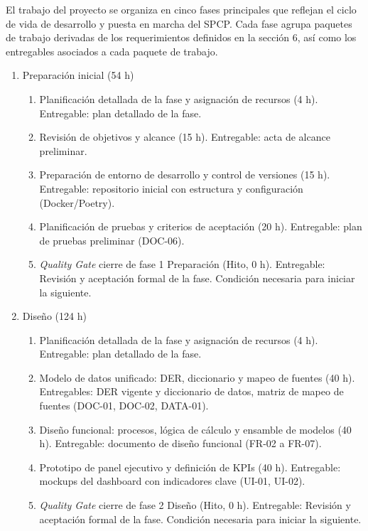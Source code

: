 \documentclass[12pt]
{charter}
\begin{document}
El trabajo del proyecto se organiza en cinco fases principales que reflejan el ciclo de vida de desarrollo y puesta en marcha del SPCP. 
Cada fase agrupa paquetes de trabajo derivadas de los requerimientos definidos en la sección 6, así como los entregables asociados a cada paquete de trabajo.

\begin{enumerate}
  \item Preparación inicial (54 h)
    \begin{enumerate}[label*=\arabic*., ref=\theenumi.\arabic*]
      \item Planificación detallada de la fase y asignación de recursos (4 h). Entregable: plan detallado de la fase.
      \item Revisión de objetivos y alcance (15 h). Entregable: acta de alcance preliminar.
      \item Preparación de entorno de desarrollo y control de versiones (15 h). Entregable: repositorio inicial con estructura y configuración (Docker/Poetry).
      \item Planificación de pruebas y criterios de aceptación (20 h). Entregable: plan de pruebas preliminar (DOC-06).
      \item \textit{Quality Gate} cierre de fase 1 Preparación (Hito, 0 h). Entregable: Revisión y aceptación formal de la fase. Condición necesaria para iniciar la siguiente.
    \end{enumerate}

  \item Diseño (124 h)
    \begin{enumerate}[label*=\arabic*., ref=\theenumi.\arabic*]
      \item Planificación detallada de la fase y asignación de recursos (4 h). Entregable: plan detallado de la fase.
      \item Modelo de datos unificado: DER, diccionario y mapeo de fuentes (40 h). Entregables: DER vigente y diccionario de datos, matriz de mapeo de fuentes (DOC-01, DOC-02, DATA-01).
      \item Diseño funcional: procesos, lógica de cálculo y ensamble de modelos (40 h). Entregable: documento de diseño funcional (FR-02 a FR-07).
      \item Prototipo de panel ejecutivo y definición de KPIs (40 h). Entregable: mockups del dashboard con indicadores clave (UI-01, UI-02).
      \item \textit{Quality Gate} cierre de fase 2 Diseño (Hito, 0 h). Entregable: Revisión y aceptación formal de la fase. Condición necesaria para iniciar la siguiente.
    \end{enumerate}


\end{enumerate}
\end{document}
